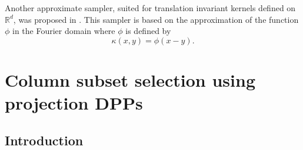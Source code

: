 \documentclass[twoside,11pt]{book}
\numberwithin{theorem}{chapter}
\numberwithin{definition}{chapter}
\numberwithin{proposition}{chapter}
\numberwithin{corollary}{chapter}
\numberwithin{example}{chapter}
\numberwithin{lemma}{chapter}
\numberwithin{assumption}{chapter}
\numberwithin{equation}{chapter}
\numberwithin{figure}{chapter}
\begin{document}
 Another approximate sampler, suited for translation invariant kernels defined on $\mathbb{R}^{d}$, was proposed in \parencite{LaMoRu15}. This sampler is based on the approximation of the function $\phi$ in the Fourier domain where $\phi$ is defined by
 \begin{equation}
 \kappa(x,y) = \phi(x-y).
 \end{equation}










\chapter{Column subset selection using projection DPPs}\label{chapter:cssp}
\section{Introduction}


\end{document}

